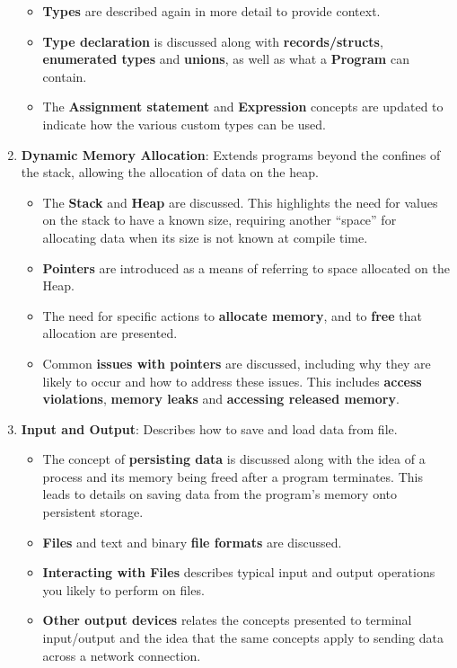 \begin{enumerate}
  \begin{itemize}[noitemsep,nolistsep]
    \item \textbf{Types} are described again in more detail to provide context. 
    \item \textbf{Type declaration} is discussed along with \textbf{records/structs}, \textbf{enumerated types} and \textbf{unions}, as well as what a \textbf{Program} can contain.
    \item The \textbf{Assignment statement} and \textbf{Expression} concepts are updated to indicate how the various custom types can be used.
  \end{itemize}
  \item \textbf{Dynamic Memory Allocation}: Extends programs beyond the confines of the stack, allowing the allocation of data on the heap.
  \begin{itemize}[noitemsep,nolistsep]
    \item The \textbf{Stack} and \textbf{Heap} are discussed. This highlights the need for values on the stack to have a known size, requiring another ``space'' for allocating data when its size is not known at compile time.
    \item \textbf{Pointers} are introduced as a means of referring to space allocated on the Heap.
    \item The need for specific actions to \textbf{allocate memory}, and to \textbf{free} that allocation are presented.
    \item Common \textbf{issues with pointers} are discussed, including why they are likely to occur and how to address these issues. This includes \textbf{access violations}, \textbf{memory leaks} and \textbf{accessing released memory}. 
  \end{itemize}
  \item \textbf{Input and Output}: Describes how to save and load data from file.
  \begin{itemize}[noitemsep,nolistsep]
    \item The concept of \textbf{persisting data} is discussed along with the idea of a process and its memory being freed after a program terminates. This leads to details on saving data from the program's memory onto persistent storage.
    \item \textbf{Files} and text and binary \textbf{file formats} are discussed. 
    \item \textbf{Interacting with Files} describes typical input and output operations you likely to perform on files.
    \item \textbf{Other output devices} relates the concepts presented to terminal input/output and the idea that the same concepts apply to sending data across a network connection.
  \end{itemize}
\end{enumerate}

